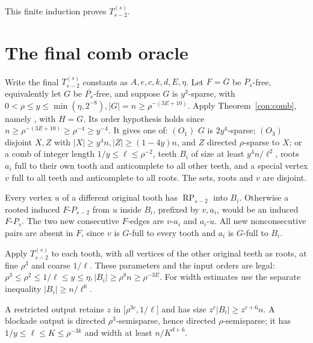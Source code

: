 \documentclass[11pt,a4paper]{article}
\theoremstyle{definition}
\theoremstyle{remark}
\numberwithin{equation}{section}
\DeclareMathOperator{\RP}{RP}
\begin{document}
This finite induction proves \(T_{s-2}^{(s)}\).


\section{The final comb oracle}\label{sec:comb}
Write the final \(T_{s-2}^{(s)}\) constants as \(A,\allowbreak e,\allowbreak c,\allowbreak k,\allowbreak d,\allowbreak E,\allowbreak \eta\). Let \(F=\overline G\) be \(P_s\)-free, equivalently let \(G\) be \(\overline{P_s}\)-free, and suppose \(G\) is \(y^3\)-sparse, with \(0<\rho\le\allowbreak y\le\allowbreak \min (\eta,\allowbreak 2^{-8}),\allowbreak  |G|=n\ge\allowbreak \rho^{-(3E+10)}\).
Apply Theorem~\ref{con:comb}, namely \cite[Lemma 2.10]{hjz}, with \(H=G\). Its order hypothesis holds since
\(n\ge\rho^{-(3E+10)}\ge\rho^{-4}\ge y^{-4}\). It gives one of:
\((O_{1})\) \(G\) is \(2y^{4}\)-sparse; \((O_{3})\) disjoint \(X,\allowbreak Z\) with \(|X|\ge\allowbreak y^{4}n,\allowbreak  |Z|\ge\allowbreak (1-4y)n\), and \(Z\) directed \(\rho\)-sparse to \(X\); or a comb of integer length \(1/y\le\allowbreak \ell\le\allowbreak \rho^{-2}\), teeth \(B_{i}\) of size at least \(y^{4}n/\ell^{2}\), roots \(a_{i}\) full to their own tooth and anticomplete to all other teeth, and a special vertex \(v\) full to all teeth and anticomplete to all roots. The sets, roots and \(v\) are disjoint.

Every vertex \(u\) of a different original tooth has \(\RP_{s-2}\) into \(B_{i}\). Otherwise a rooted induced \(F\text{-}P_{s-2}\) from \(u\) inside \(B_{i}\), prefixed by \(v,\allowbreak a_{i}\), would be an induced \(F\text{-}P_{s}\). The two new consecutive \(F\)-edges are \(v\text{-}a_{i}\) and \(a_{i}\text{-}u\). All new nonconsecutive pairs are absent in \(F\), since \(v\) is \(G\)-full to every tooth and \(a_{i}\) is \(G\)-full to \(B_{i}\).

Apply \(T_{s-2}^{(s)}\) to each tooth, with all vertices of the other original teeth as roots, at fine \(\rho^{3}\) and coarse \(1/\ell\). These parameters and the input orders are legal: \(\rho^{3}\le\allowbreak \rho^{2}\le\allowbreak 1/\ell\le\allowbreak y\le\allowbreak \eta,\allowbreak  |B_{i}|\ge\allowbreak \rho^{8} n\ge\allowbreak \rho^{-3E}\). For width estimates use the separate inequality \(|B_{i}|\ge\allowbreak n/\ell^{6}\).

A restricted output retains \(z\) in [\(\rho^{3c},\allowbreak 1/\ell\)] and has size \(z^{e} |B_{i}|\ge\allowbreak z^{e+6}n\). A blockade output is directed \(\rho^{3}\)-semisparse, hence directed \(\rho\)-semisparse; it has \(1/y\le\allowbreak \ell\le\allowbreak K\le\allowbreak \rho^{-3k}\) and width at least \(n/K^{d+6}\).
\end{document}
